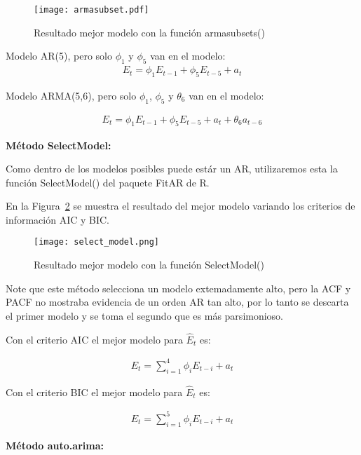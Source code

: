 \documentclass[11pt, letterpaper, twoside]{article}
\begin{document}
\begin{figure}[ht!]
\centering
\texttt{[image: armasubset.pdf]}
\caption{Resultado mejor modelo con la función armasubsets()}
\label{fig:armasubset}
\end{figure}

Modelo AR(5), pero solo $\phi_1$ y $\phi_5$ van en el modelo:
\begin{align}
\label{eq:mod_err_armasubset1}
    E_t = \phi_1 E_{t-1} + \phi_5 E_{t-5} + a_t
\end{align}

Modelo ARMA(5,6), pero solo $\phi_1$, $\phi_5$ y $\theta_6$ van en el modelo:

\begin{align}
\label{eq:mod_err_armasubset2}
    E_t = \phi_1 E_{t-1} + \phi_5 E_{t-5} + a_t + \theta_6 a_{t-6}
\end{align}

\textbf{Método SelectModel:}

Como dentro de los modelos posibles puede estár un AR, utilizaremos esta la función SelectModel() del paquete FitAR de R.

En la Figura~\ref{fig:select_model} se muestra el resultado del mejor modelo variando los criterios de información AIC y BIC.

\begin{figure}[ht!]
\centering
\texttt{[image: select\_model.png]}
\caption{Resultado mejor modelo con la función SelectModel()}
\label{fig:select_model}
\end{figure}

Note que este método selecciona un modelo extemadamente alto, pero la ACF y PACF no mostraba evidencia de un orden AR tan alto, por lo tanto se descarta el primer modelo y se toma el segundo que es más parsimonioso.

Con el criterio AIC el mejor modelo para $\hat{E}_t$ es:

\begin{align}
\label{eq:mod_err_select_model1}
    E_t = \sum_{i=1}^{4} \phi_i E_{t-i} + a_t
\end{align}

Con el criterio BIC el mejor modelo para $\hat{E}_t$ es:

\begin{align}
\label{eq:mod_err_select_model2}
    E_t = \sum_{i=1}^{5} \phi_i E_{t-i} + a_t
\end{align}

\textbf{Método auto.arima:}
\end{document}

